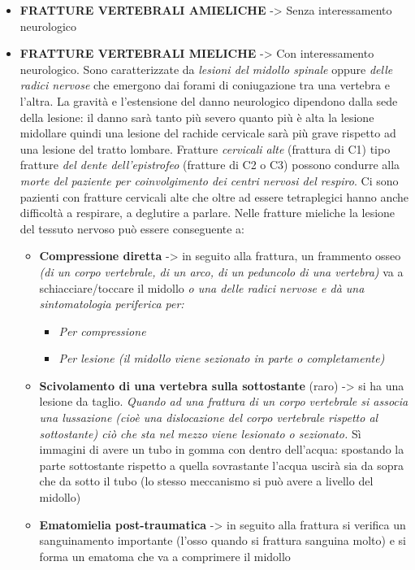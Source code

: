 \begin{itemize}
\item
  \textbf{FRATTURE VERTEBRALI AMIELICHE} -> Senza interessamento neurologico
\item
  \textbf{FRATTURE VERTEBRALI MIELICHE} -> Con interessamento neurologico. Sono caratterizzate da \emph{lesioni del midollo spinale} oppure \emph{delle radici nervose} che emergono dai forami di coniugazione tra una vertebra e l'altra. La gravità e l'estensione del danno neurologico dipendono dalla sede della lesione: il danno sarà tanto più severo quanto più è alta la lesione midollare quindi una lesione del rachide cervicale sarà più grave rispetto ad una lesione del tratto lombare. Fratture \emph{cervicali alte} (frattura di C1) tipo fratture \emph{del dente dell'epistrofeo} (fratture di C2 o C3) possono condurre alla \emph{morte del paziente per coinvolgimento dei centri nervosi del respiro}. Ci sono pazienti con fratture cervicali alte che oltre ad essere tetraplegici hanno anche difficoltà a respirare, a deglutire a parlare.
Nelle fratture mieliche la lesione del tessuto nervoso può essere conseguente a:
\begin{itemize}
\item
  \textbf{Compressione diretta} -> in seguito alla frattura, un frammento osseo \emph{(di un corpo vertebrale, di un arco, di un peduncolo di una vertebra)} va a schiacciare/toccare il midollo \emph{o una delle radici nervose e dà una sintomatologia periferica per:}

\begin{itemize}
\item
  \emph{Per compressione}
\item
  \emph{Per lesione (il midollo viene sezionato in parte o completamente)}
\end{itemize}

\item
  \textbf{Scivolamento di una vertebra sulla sottostante} (raro) -> si ha una lesione da taglio. \emph{Quando ad una frattura di un corpo vertebrale si associa una lussazione (cioè una dislocazione del corpo vertebrale rispetto al sottostante) ciò che sta nel mezzo viene lesionato o sezionato.} Sì immagini di avere un tubo in gomma con dentro dell'acqua: spostando la parte sottostante rispetto a quella sovrastante l'acqua uscirà sia da sopra che da sotto il tubo (lo stesso meccanismo si può avere a livello del midollo)
\item
  \textbf{Ematomielia post-traumatica} -> in seguito alla frattura si verifica un sanguinamento importante (l'osso quando si frattura sanguina molto) e si forma un ematoma che va a comprimere il midollo
\end{itemize}
\end{itemize}

